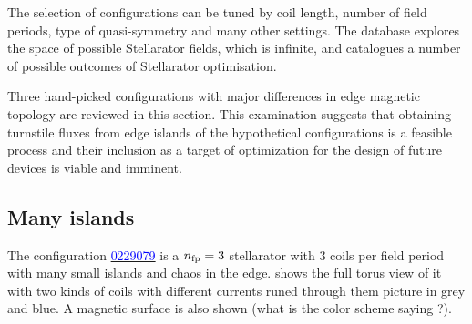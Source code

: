The selection of configurations can be tuned by coil length, number of field periods, type of quasi-symmetry and many other settings. The database explores the space of possible Stellarator fields, which is infinite, and catalogues a number of possible outcomes of Stellarator optimisation. 

Three hand-picked configurations with major differences in edge magnetic topology are reviewed in this section. This examination suggests that obtaining turnstile fluxes from edge islands of the hypothetical configurations is a feasible process and their inclusion as a target of optimization for the design of future devices is viable and imminent.

\subsection{Many islands}\label{sec:quars-0229079}

The configuration \href{https://quasr.flatironinstitute.org/model/0229079}{\textcolor{blue}{0229079}} is a $n_\text{fp} = 3$ stellarator with 3 coils per field period with many small islands and chaos in the edge.  shows the full torus view of it with two kinds of coils with different currents runed through them picture in grey and blue. A magnetic surface is also shown (what is the color scheme saying ?).

